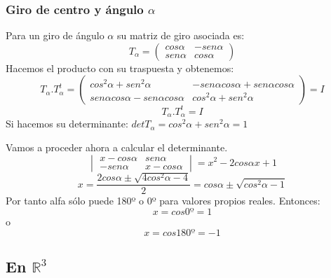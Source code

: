 \documentclass [a4paper,12pt]{article}
\begin{document}
\subsubsection{Giro de centro y ángulo $\alpha$}
Para un giro de ángulo 
$\alpha$ su matriz de giro asociada es:
$$
T_\alpha=\begin{pmatrix}
cos\alpha&-sen\alpha\\
sen\alpha&cos\alpha
\end{pmatrix}
$$
Hacemos el producto con su traspuesta y obtenemos:
$$
T_\alpha .T^t_{\alpha}=\begin{pmatrix}
cos^2\alpha+sen^2\alpha&-sen\alpha cos\alpha + sen\alpha cos\alpha \\
sen\alpha cos\alpha-sen\alpha cos\alpha&cos^2\alpha+sen^2\alpha
\end{pmatrix}= I
$$
$$
T_\alpha .T^t_{\alpha}=I
$$
Si hacemos su determinante:
$det T_\alpha = cos^2\alpha+sen^2\alpha = 1$\par
Vamos a proceder ahora a calcular el determinante.
$$
\begin{vmatrix}
x-cos\alpha&sen\alpha\\
-sen\alpha&x-cos\alpha
\end{vmatrix}=x^2-2 cos\alpha x +1
$$
$$
x=\frac{2 cos\alpha \pm \sqrt{4 cos^2 \alpha -4}}{2}=cos \alpha \pm \sqrt{cos^2\alpha -1}
$$
Por tanto alfa sólo puede 180º o 0º para valores propios reales. Entonces:
$$x=cos 0º=1$$ o
$$x=cos 180º=-1$$
\subsection{En  $\mathbb{R}^3$}
\end{document}

